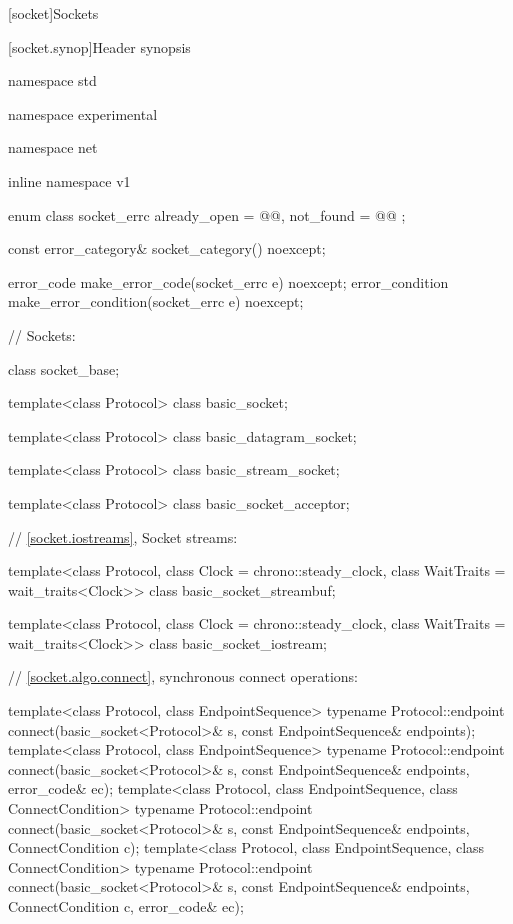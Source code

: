 
[socket]{Sockets}


%
[socket.synop]{Header  synopsis}

%
\begin{codeblock}
namespace std {
namespace experimental {
namespace net {
inline namespace v1 {

  enum class socket_errc {
    already_open = @@,
    not_found = @@
  };

  const error_category& socket_category() noexcept;

  error_code make_error_code(socket_errc e) noexcept;
  error_condition make_error_condition(socket_errc e) noexcept;

  // Sockets:

  class socket_base;

  template<class Protocol>
    class basic_socket;

  template<class Protocol>
    class basic_datagram_socket;

  template<class Protocol>
    class basic_stream_socket;

  template<class Protocol>
    class basic_socket_acceptor;

  // \ref{socket.iostreams}, Socket streams:

  template<class Protocol, class Clock = chrono::steady_clock,
    class WaitTraits = wait_traits<Clock>>
      class basic_socket_streambuf;

  template<class Protocol, class Clock = chrono::steady_clock,
    class WaitTraits = wait_traits<Clock>>
      class basic_socket_iostream;

  // \ref{socket.algo.connect}, synchronous connect operations:

  template<class Protocol, class EndpointSequence>
    typename Protocol::endpoint connect(basic_socket<Protocol>& s,
                                        const EndpointSequence& endpoints);
  template<class Protocol, class EndpointSequence>
    typename Protocol::endpoint connect(basic_socket<Protocol>& s,
                                        const EndpointSequence& endpoints,
                                        error_code& ec);
  template<class Protocol, class EndpointSequence, class ConnectCondition>
    typename Protocol::endpoint connect(basic_socket<Protocol>& s,
                                        const EndpointSequence& endpoints,
                                        ConnectCondition c);
  template<class Protocol, class EndpointSequence, class ConnectCondition>
    typename Protocol::endpoint connect(basic_socket<Protocol>& s,
                                        const EndpointSequence& endpoints,
                                        ConnectCondition c,
                                        error_code& ec);

}}}}
\end{codeblock}
